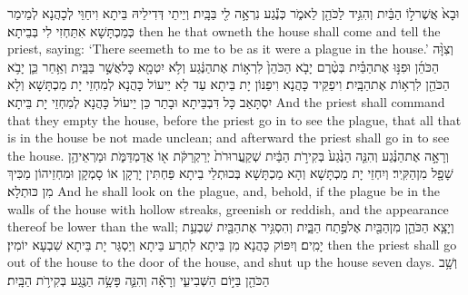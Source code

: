 {וּבָא֙ אֲשֶׁר\maqqaf ל֣וֹ הַבַּ֔יִת וְהִגִּ֥יד לַכֹּהֵ֖ן לֵאמֹ֑ר כְּנֶ֕גַע נִרְאָ֥ה לִ֖י בַּבָּֽיִת׃}
{וְיֵיתֵי דְּדִילֵיהּ בֵּיתָא וִיחַוֵּי לְכָהֲנָא לְמֵימַר כְּמַכְתָּשָׁא אִתַּחְזִי לִי בְּבֵיתָא׃}
{then he that owneth the house shall come and tell the priest, saying: ‘There seemeth to me to be as it were a plague in the house.’}{}
{וְצִוָּ֨ה הַכֹּהֵ֜ן וּפִנּ֣וּ אֶת\maqqaf הַבַּ֗יִת בְּטֶ֨רֶם יָבֹ֤א הַכֹּהֵן֙ לִרְא֣וֹת אֶת\maqqaf הַנֶּ֔גַע וְלֹ֥א יִטְמָ֖א כׇּל\maqqaf אֲשֶׁ֣ר בַּבָּ֑יִת וְאַ֥חַר כֵּ֛ן יָבֹ֥א הַכֹּהֵ֖ן לִרְא֥וֹת אֶת\maqqaf הַבָּֽיִת׃}
{וִיפַקֵּיד כָּהֲנָא וִיפַנּוֹן יָת בֵּיתָא עַד לָא יֵיעוֹל כָּהֲנָא לְמִחְזֵי יָת מַכְתָּשָׁא וְלָא יִסְתָּאַב כָּל דִּבְבֵּיתָא וּבָתַר כֵּן יֵיעוֹל כָּהֲנָא לְמִחְזֵי יָת בֵּיתָא׃}
{And the priest shall command that they empty the house, before the priest go in to see the plague, that all that is in the house be not made unclean; and afterward the priest shall go in to see the house.}{}
{וְרָאָ֣ה אֶת\maqqaf הַנֶּ֗גַע וְהִנֵּ֤ה הַנֶּ֙גַע֙ בְּקִירֹ֣ת הַבַּ֔יִת שְׁקַֽעֲרוּרֹת֙ יְרַקְרַקֹּ֔ת א֖וֹ אֲדַמְדַּמֹּ֑ת וּמַרְאֵיהֶ֥ן שָׁפָ֖ל מִן\maqqaf הַקִּֽיר׃}
{וְיִחְזֵי יָת מַכְתָּשָׁא וְהָא מַכְתָּשָׁא בְּכוּתְלֵי בֵיתָא פַּחְתִּין יָרְקָן אוֹ סָמְקָן וּמִחְזֵיהוֹן מַכִּיךְ מִן כּוּתְלָא׃}
{And he shall look on the plague, and, behold, if the plague be in the walls of the house with hollow streaks, greenish or reddish, and the appearance thereof be lower than the wall;}{}
{וְיָצָ֧א הַכֹּהֵ֛ן מִן\maqqaf הַבַּ֖יִת אֶל\maqqaf פֶּ֣תַח הַבָּ֑יִת וְהִסְגִּ֥יר אֶת\maqqaf הַבַּ֖יִת שִׁבְעַ֥ת יָמִֽים׃}
{וְיִפּוֹק כָּהֲנָא מִן בֵּיתָא לִתְרַע בֵּיתָא וְיַסְגַּר יָת בֵּיתָא שִׁבְעָא יוֹמִין׃}
{then the priest shall go out of the house to the door of the house, and shut up the house seven days.}{}
{וְשָׁ֥ב הַכֹּהֵ֖ן בַּיּ֣וֹם הַשְּׁבִיעִ֑י וְרָאָ֕ה וְהִנֵּ֛ה פָּשָׂ֥ה הַנֶּ֖גַע בְּקִירֹ֥ת הַבָּֽיִת׃}
